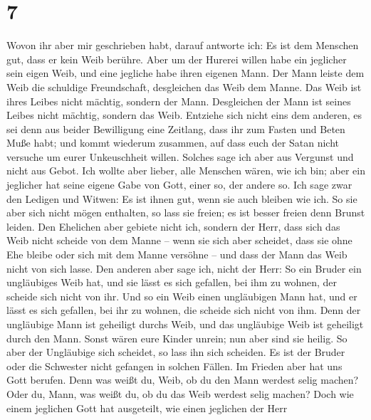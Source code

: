 \hypertarget{section-6}{%
\section{7}\label{section-6}}

 Wovon ihr aber mir geschrieben habt, darauf antworte ich:
Es ist dem Menschen gut, dass er kein Weib berühre.  Aber
um der Hurerei willen habe ein jeglicher sein eigen Weib, und eine
jegliche habe ihren eigenen Mann.  Der Mann leiste dem
Weib die schuldige Freundschaft, desgleichen das Weib dem Manne.
 Das Weib ist ihres Leibes nicht mächtig, sondern der
Mann. Desgleichen der Mann ist seines Leibes nicht mächtig, sondern das
Weib.  Entziehe sich nicht eins dem anderen, es sei denn
aus beider Bewilligung eine Zeitlang, dass ihr zum Fasten und Beten Muße
habt; und kommt wiederum zusammen, auf dass euch der Satan nicht
versuche um eurer Unkeuschheit willen.  Solches sage ich
aber aus Vergunst und nicht aus Gebot.  Ich wollte aber
lieber, alle Menschen wären, wie ich bin; aber ein jeglicher hat seine
eigene Gabe von Gott, einer so, der andere so.  Ich sage
zwar den Ledigen und Witwen: Es ist ihnen gut, wenn sie auch bleiben wie
ich.  So sie aber sich nicht mögen enthalten, so lass sie
freien; es ist besser freien denn Brunst leiden.  Den
Ehelichen aber gebiete nicht ich, sondern der Herr, dass sich das Weib
nicht scheide von dem Manne --  wenn sie sich aber
scheidet, dass sie ohne Ehe bleibe oder sich mit dem Manne versöhne --
und dass der Mann das Weib nicht von sich lasse.  Den
anderen aber sage ich, nicht der Herr: So ein Bruder ein ungläubiges
Weib hat, und sie lässt es sich gefallen, bei ihm zu wohnen, der scheide
sich nicht von ihr.  Und so ein Weib einen ungläubigen
Mann hat, und er lässt es sich gefallen, bei ihr zu wohnen, die scheide
sich nicht von ihm.  Denn der ungläubige Mann ist
geheiligt durchs Weib, und das ungläubige Weib ist geheiligt durch den
Mann. Sonst wären eure Kinder unrein; nun aber sind sie heilig.
 So aber der Ungläubige sich scheidet, so lass ihn sich
scheiden. Es ist der Bruder oder die Schwester nicht gefangen in solchen
Fällen. Im Frieden aber hat uns Gott berufen.  Denn was
weißt du, Weib, ob du den Mann werdest selig machen? Oder du, Mann, was
weißt du, ob du das Weib werdest selig machen?  Doch wie
einem jeglichen Gott hat ausgeteilt, wie einen jeglichen der Herr
